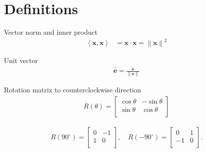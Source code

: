 \section{Definitions}

Vector norm and inner product
\begin{align}
\left\langle \mathbf{x}, \mathbf{x} \right\rangle &= \mathbf{x} \cdot \mathbf{x} = \left\| \mathbf{x}\right\|^{2}
\end{align}

Unit vector
\begin{align}
\hat{\mathbf{e}} = \frac{\mathbf{e}}{\left\|\mathbf{e}\right\|}
\end{align}

Rotation matrix to counterclockwise direction
\begin{align}
R(\theta) = \begin{bmatrix}\cos \theta & -\sin \theta \\\sin \theta & \cos \theta \\\end{bmatrix}
\end{align}

\begin{align}
R(90^{\circ}) = \begin{bmatrix}0 & -1 \\ 1 & 0 \\\end{bmatrix}, \quad R(-90^{\circ}) = \begin{bmatrix}0 & 1 \\ -1 & 0 \\\end{bmatrix}. \\
\end{align}